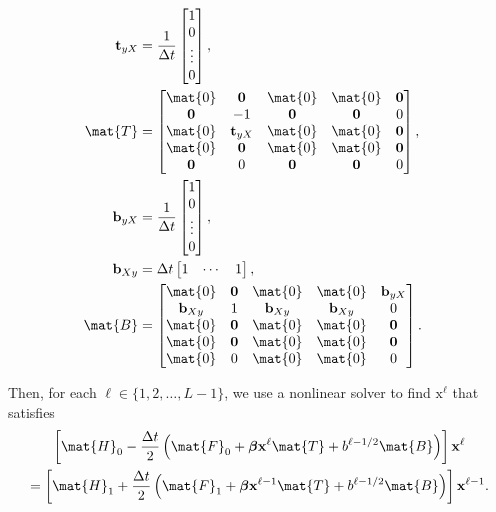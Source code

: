 \documentclass{jpmarticle}
\renewcommand{\vec}[1]{\boldsymbol{\mathrm{#1}}}
\let\subequationsorig\subequations%
\let\endsubequationsorig\endsubequations%
\renewenvironment{subequations}{
  \subequationsorig
  \renewcommand{\theequation}{\theparentequation.\arabic{equation}}
}{
  \endsubequationsorig
}
\begin{document}
\begin{subequations}
\begin{align}
    \\
    \vec{t}_{yX} &=
    \frac{1}{\Delta t}
    \begin{bmatrix}
      1 \\ 0 \\ \vdots \\ 0
    \end{bmatrix},
    \\
    \mat{T} &=
    \begin{bmatrix}
      \mat{0} & \vec{0} & \mat{0} & \mat{0} & \vec{0}
      \\
      \vec{0} & - 1 & \vec{0} & \vec{0} & 0
      \\
      \mat{0} & \vec{t}_{yX} & \mat{0} & \mat{0} & \vec{0}
      \\
      \mat{0} & \vec{0} & \mat{0} & \mat{0} & \vec{0}
      \\
      \vec{0} & 0 & \vec{0} & \vec{0} & 0
    \end{bmatrix},
    \\
    \vec{b}_{yX} &=
    \frac{1}{\Delta t}
    \begin{bmatrix}
      1 \\ 0 \\ \vdots \\ 0
    \end{bmatrix},
    \\
    \vec{b}_{Xy} &=
    \Delta t
    \begin{bmatrix}
      1 & \cdots & 1
    \end{bmatrix},
    \\
    \mat{B} &=
    \begin{bmatrix}
      \mat{0} & \vec{0} & \mat{0} & \mat{0} & \vec{b}_{yX}
      \\
      \vec{b}_{Xy} & 1 & \vec{b}_{Xy} & \vec{b}_{Xy} & 0
      \\
      \mat{0} & \vec{0} & \mat{0} & \mat{0} & \vec{0}
      \\
      \mat{0} & \vec{0} & \mat{0} & \mat{0} & \vec{0}
      \\
      \mat{0} & 0 & \mat{0} & \mat{0} & 0
    \end{bmatrix}.
  \end{align}
\end{subequations}
Then, for each $\ell \in \{1, 2, \ldots, L - 1\}$,
we use a nonlinear solver to find $\vec{x}^{\ell}$ that satisfies
\begin{multline}
  \left[
    \mat{H}_0
    - \frac{\Delta t}{2}
    \left(
      \mat{F}_0
      + \vec{\beta} \vec{x}^{\ell} \mat{T}
      + b^{\ell - 1 / 2} \mat{B}
    \right)
  \right] \vec{x}^{\ell}
  \\
  = \left[
    \mat{H}_1
    + \frac{\Delta t}{2}
    \left(
      \mat{F}_1
      + \vec{\beta} \vec{x}^{\ell - 1} \mat{T}
      + b^{\ell - 1 / 2} \mat{B}
    \right)
  \right] \vec{x}^{\ell - 1}.
\end{multline}
\end{document}
